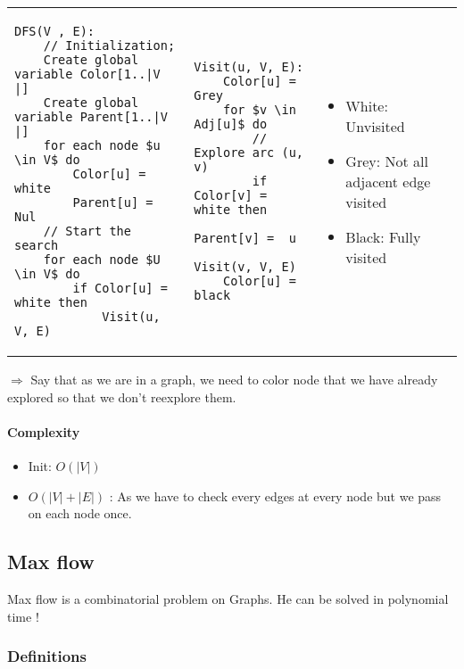 \begin{tabular}{m{7cm}m{5cm}m{3cm}}
    \begin{lstlisting}[mathescape]
DFS(V , E):
    // Initialization;
    Create global variable Color[1..|V |]
    Create global variable Parent[1..|V |]
    for each node $u \in V$ do 
        Color[u] = white
        Parent[u] = Nul
    // Start the search
    for each node $U \in V$ do
        if Color[u] = white then
            Visit(u, V, E)
    \end{lstlisting}
    &
    \begin{lstlisting}[mathescape]
Visit(u, V, E):
    Color[u] = Grey
    for $v \in Adj[u]$ do
        // Explore arc (u, v)
        if Color[v] = white then
            Parent[v] =  u
            Visit(v, V, E)
    Color[u] = black
    \end{lstlisting}
    &
    \begin{itemize}
        \item White: Unvisited
        \item Grey: Not all adjacent edge visited
        \item Black: Fully visited
        \end{itemize}
\end{tabular}

$\Rightarrow$ Say that as we are in a graph, we need to color node that we have
already explored so that we don't reexplore them. 

\paragraph{Complexity}
\begin{itemize}
    \item Init: $O(|V|)$
    \item $O(|V| + |E|)$ : As we have to check every edges at every node
        but we pass on each node once.
\end{itemize}

\subsection{Max flow}

Max flow is a combinatorial problem on Graphs.
He can be solved in polynomial time !

\subsubsection{Definitions}

